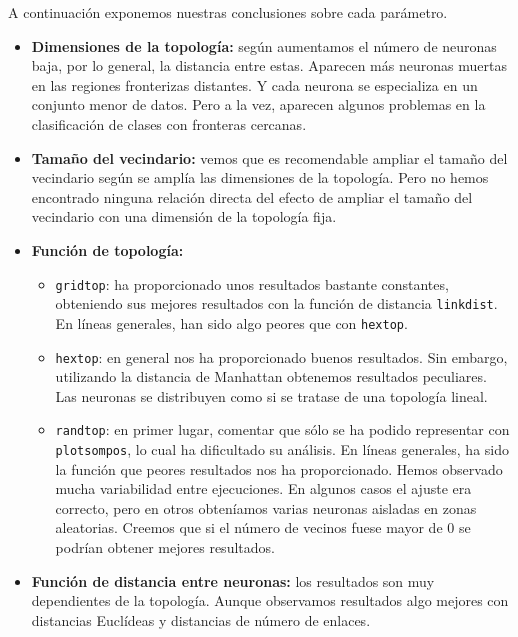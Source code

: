 \documentclass[a4paper,12pt,titlepage]{article}
\begin{document}
A continuación exponemos nuestras conclusiones sobre cada parámetro.
 
\begin{itemize}[noitemsep]
	\item \textbf{Dimensiones de la topología:} según aumentamos el número de neuronas baja, por lo general, la distancia entre estas. Aparecen más neuronas muertas en las regiones fronterizas distantes. Y cada neurona se especializa en un conjunto menor de datos. Pero a la vez, aparecen algunos problemas en la clasificación de clases con fronteras cercanas.
	\item \textbf{Tamaño del vecindario:} vemos que es recomendable ampliar el tamaño del vecindario según se amplía las dimensiones de la topología. Pero no hemos encontrado ninguna relación directa del efecto de ampliar el tamaño del vecindario con una dimensión de la topología fija.
	\item \textbf{Función de topología:} 
	\begin{itemize}[noitemsep]
		\item \lstinline|gridtop|: ha proporcionado unos resultados bastante constantes, obteniendo sus mejores resultados con la función de distancia \lstinline|linkdist|. En líneas generales, han sido algo peores que con \lstinline|hextop|.
		\item \lstinline|hextop|: en general nos ha proporcionado buenos resultados. Sin embargo, utilizando la distancia de Manhattan obtenemos resultados peculiares. Las neuronas se distribuyen como si se tratase de una topología lineal.
		\item \lstinline|randtop|: en primer lugar, comentar que sólo se ha podido representar con \lstinline|plotsompos|, lo cual ha dificultado su análisis. En líneas generales, ha sido la función que peores resultados nos ha proporcionado. Hemos observado mucha variabilidad entre ejecuciones. En algunos casos el ajuste era correcto, pero en otros obteníamos varias neuronas aisladas en zonas aleatorias. Creemos que si el número de vecinos fuese mayor de 0 se podrían obtener mejores resultados.		
	\end{itemize}
	\item \textbf{Función de distancia entre neuronas:} los resultados son muy dependientes de la topología. Aunque observamos resultados algo mejores con distancias Euclídeas y distancias de número de enlaces.
\end{itemize}




\end{document}
